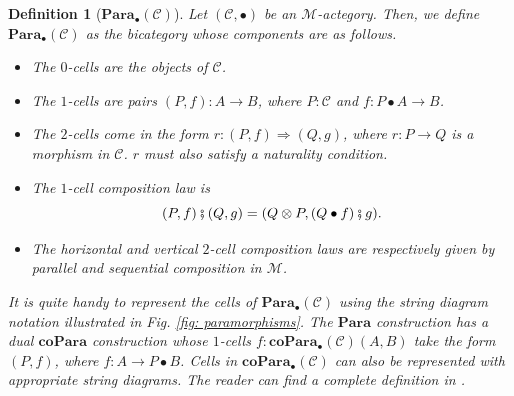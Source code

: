 \documentclass[11pt,a4paper,openright,twoside]{report}
\newcounter{mycounter}
\theoremstyle{plain}
\newtheorem{definition}[mycounter]{Definition}
\theoremstyle{definition}
\begin{document}
\begin{definition}[$\mathbf{Para}_{\bullet}(\mathcal{C})$]
  \label{def: para}
  Let $(\mathcal{C}, \bullet)$ be an $\mathcal{M}$-actegory. Then, we define $\mathbf{Para}_{\bullet}(\mathcal{C})$ as the bicategory whose components are as follows.
  \begin{itemize}
    \item The $0$-cells are the objects of $\mathcal{C}$.
    \item The $1$-cells are pairs $(P,f): A \to B$, where $P : \mathcal{C}$ and $f: P \bullet A \to B$.
    \item The $2$-cells come in the form $r: (P,f) \Rightarrow (Q,g)$, where $r: P \to Q$ is a morphism in $\mathcal{C}$. $r$ must also satisfy a naturality condition.
    \item The $1$-cell composition law is
    \[(P,f) \fatsemi (Q,g) = (Q \otimes P, (Q \bullet f)  \fatsemi g).\]
    \item The horizontal and vertical $2$-cell composition laws are respectively given by parallel and sequential composition in $\mathcal{M}$. 
  \end{itemize}
  It is quite handy to represent the cells of $\mathbf{Para}_{\bullet}(\mathcal{C})$ using the string diagram notation illustrated in \textit{Fig. \ref{fig: paramorphisms}}. The $\mathbf{Para}$ construction has a dual $\mathbf{coPara}$ construction whose $1$-cells $f:\mathbf{coPara}_{\bullet}(\mathcal{C})(A,B)$ take the form $(P,f)$, where $f: A \to P \bullet B$. Cells in $\mathbf{coPara}_{\bullet}(\mathcal{C})$ can also be represented with appropriate string diagrams. The reader can find a complete definition in \cite{gavranovic2024fundamental}.
\end{definition}
\end{document}
